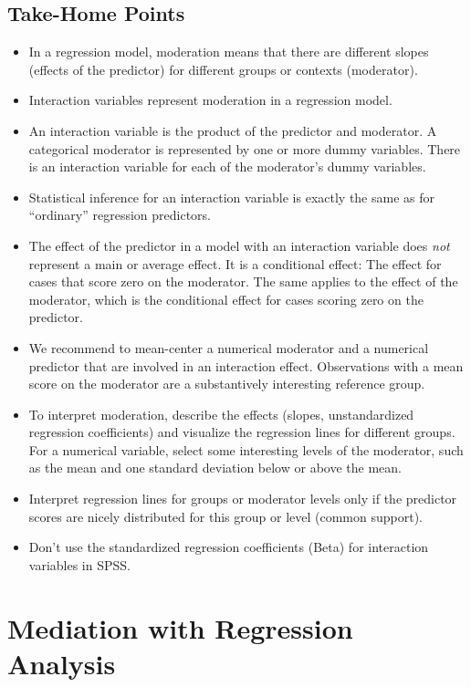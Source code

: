 \documentclass[a4paper]{book}
\theoremstyle{definition}
\theoremstyle{definition}
\theoremstyle{definition}
\theoremstyle{remark}
\begin{document}
\section{Take-Home Points}\label{take-home-points-7}

\begin{itemize}
\item
  In a regression model, moderation means that there are different
  slopes (effects of the predictor) for different groups or contexts
  (moderator).
\item
  Interaction variables represent moderation in a regression model.
\item
  An interaction variable is the product of the predictor and moderator.
  A categorical moderator is represented by one or more dummy variables.
  There is an interaction variable for each of the moderator's dummy
  variables.
\item
  Statistical inference for an interaction variable is exactly the same
  as for ``ordinary'' regression predictors.
\item
  The effect of the predictor in a model with an interaction variable
  does \emph{not} represent a main or average effect. It is a
  conditional effect: The effect for cases that score zero on the
  moderator. The same applies to the effect of the moderator, which is
  the conditional effect for cases scoring zero on the predictor.
\item
  We recommend to mean-center a numerical moderator and a numerical
  predictor that are involved in an interaction effect. Observations
  with a mean score on the moderator are a substantively interesting
  reference group.
\item
  To interpret moderation, describe the effects (slopes, unstandardized
  regression coefficients) and visualize the regression lines for
  different groups. For a numerical variable, select some interesting
  levels of the moderator, such as the mean and one standard deviation
  below or above the mean.
\item
  Interpret regression lines for groups or moderator levels only if the
  predictor scores are nicely distributed for this group or level
  (common support).
\item
  Don't use the standardized regression coefficients (Beta) for
  interaction variables in SPSS.
\end{itemize}

\chapter{Mediation with Regression Analysis}\label{mediation}
\end{document}
